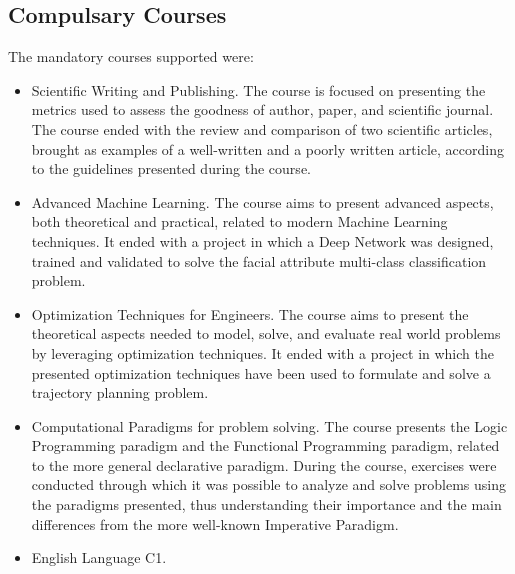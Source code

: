 \subsection{Compulsary Courses}
The mandatory courses supported were:
\begin{itemize}
    \item Scientific Writing and Publishing. The course is focused on presenting the metrics used to assess the goodness of author, paper, and scientific journal. The course ended with the review and comparison of two scientific articles, brought as examples of a well-written and a poorly written article, according to the guidelines presented during the course. 
    \item Advanced Machine Learning. The course aims to present advanced aspects, both theoretical and practical, related to modern Machine Learning techniques. It ended with a project in which a Deep Network was designed, trained and validated to solve the facial attribute multi-class classification problem.
    \item Optimization Techniques for Engineers. The course aims to present the theoretical aspects needed to model, solve, and evaluate real world problems by leveraging optimization techniques. It ended with a project in which the presented optimization techniques have been used to formulate and solve a trajectory planning problem.
    \item Computational Paradigms for problem solving. The course presents the Logic Programming paradigm and the Functional Programming paradigm, related to the more general declarative paradigm. During the course, exercises were conducted through which it was possible to analyze and solve problems using the paradigms presented, thus understanding their importance and the main differences from the more well-known Imperative Paradigm.
    \item English Language C1.
\end{itemize}